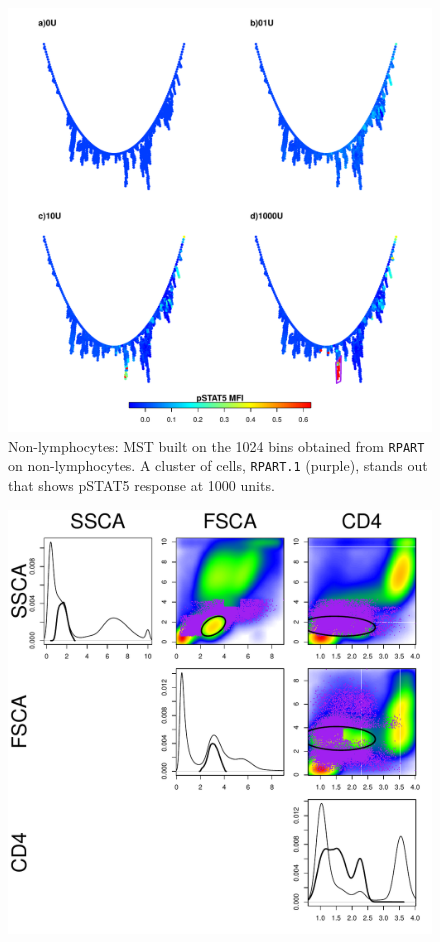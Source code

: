 \begin{figure}[!h]
\begin{minipage}{\textwidth}
\centering
\includegraphics[scale=.6]{figures/rpart-nonlymphocytes-mst-1024bin}
{ Non-lymphocytes: MST built on the 1024 bins obtained from \texttt{RPART} on non-lymphocytes. }
{
    A cluster of cells, \texttt{RPART.1} (purple), stands out that shows pSTAT5 response at 1000 units.
} 
\end{minipage}
%
\begin{minipage}{.6\textwidth}
\includegraphics[scale=.5]{figures/rpart-nonlymphocytes-scatter-clusters}

\end{minipage}
\end{figure}
